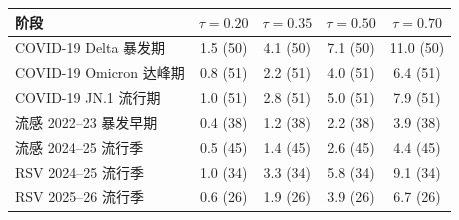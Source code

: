 \begin{tabular}{lcccc}
\toprule
阶段 & $\tau=0.20$ & $\tau=0.35$ & $\tau=0.50$ & $\tau=0.70$ \\
\midrule
COVID-19 Delta 暴发期 & 1.5 (50) & 4.1 (50) & 7.1 (50) & 11.0 (50) \\
COVID-19 Omicron 达峰期 & 0.8 (51) & 2.2 (51) & 4.0 (51) & 6.4 (51) \\
COVID-19 JN.1 流行期 & 1.0 (51) & 2.8 (51) & 5.0 (51) & 7.9 (51) \\
流感 2022--23 暴发早期 & 0.4 (38) & 1.2 (38) & 2.2 (38) & 3.9 (38) \\
流感 2024--25 流行季 & 0.5 (45) & 1.4 (45) & 2.6 (45) & 4.4 (45) \\
RSV 2024--25 流行季 & 1.0 (34) & 3.3 (34) & 5.8 (34) & 9.1 (34) \\
RSV 2025--26 流行季 & 0.6 (26) & 1.9 (26) & 3.9 (26) & 6.7 (26) \\
\bottomrule
\end{tabular}
